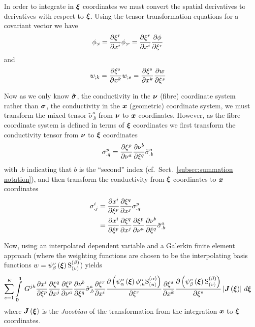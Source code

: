 In order to integrate in $\vect{\xi}$ coordinates we must convert the spatial
derivatives to derivatives with respect to $\vect{\xi}$. Using the tensor
transformation equations for a covariant vector we have
\begin{equation}  
   {\phi}_{;i} = \dfrac{\partial \xi^{r}}{\partial x^{i}}  {\phi}_{;r} = \dfrac{\partial \xi^{r}}{\partial x^{i}}  \dfrac{\partial \phi}{\partial \xi^{r}} 
\end{equation}
and 
\begin{equation}
   {w}_{;k} = \dfrac{\partial \xi^{s}}{\partial x^{k}}  {w}_{;s} = \dfrac{\partial \xi^{s}}{\partial x^{k}}  \dfrac{\partial w}{\partial \xi^{s}} 
\end{equation}

Now as we only know $\boldsymbol{\tilde{\sigma}}$, the conductivity in the
$\vect{\nu}$ (fibre) coordinate system rather than $\boldsymbol{\sigma}$, the
conductivity in the $\vect{x}$ (geometric) coordinate system, we must transform the mixed
tensor ${\tilde{\sigma}}^{a}_{.b}$ from $\vect{\nu}$ to $\vect{x}$ coordinates. However, as the
fibre coordinate system is defined in terms of $\vect{\xi}$ coordinates we
first transform the conductivity tensor from $\vect{\nu}$ to $\vect{\xi}$
coordinates \ie
\begin{equation}
  \sigma^{p}_{.q}= \dfrac{\partial \xi^{p}}{\partial \nu^{a}}  \dfrac{\partial \nu^{b}}{\partial \xi^{q}} {\tilde{\sigma}}^{a}_{.b}
\end{equation}
with $.b$ indicating that $b$ is the ``second'' index (cf.~Sect.~\ref{subsec:summation notation}),
and then transform the conductivity from $\vect{\xi}$ coordinates to
$\vect{x}$ coordinates \ie
\begin{equation}
  \begin{split}
    \sigma^{i}_{.j} &=  \dfrac{\partial x^{i}}{\partial \xi^{p}}  \dfrac{\partial \xi^{q}}{\partial x^{j}} {\sigma}^{p}_{.q} \\
    &=  \dfrac{\partial x^{i}}{\partial \xi^{p}}  \dfrac{\partial \xi^{q}}{\partial x^{j}}  \dfrac{\partial \xi^{p}}{\partial \nu^{a}}  \dfrac{\partial \nu^{b}}{\partial \xi^{q}} {\tilde{\sigma}}^{a}_{.b}
  \end{split}
\end{equation}

Now, using an interpolated dependent variable and a Galerkin finite element
approach (where the weighting functions are chosen to be the interpolating
basis functions \ie $w=\gbfn{\beta}{v}{\vect{\xi}}\gsf{(\beta)}{(v)}$) yields
\begin{equation}
  \dsum_{e=1}^{E}\gint{\vect{0}}{\vect{1}}{G^{jk}\delby{x^{i}}{\xi^{p}}
    \delby{\xi^{q}}{x^{j}}\delby{\xi^{p}} {\nu^{a}}
    \delby{\nu^{b}}{\xi^{q}}{\tilde{\sigma}}^{a}_{.b}\delby{\xi^{r}}{x^{i}}
    \delby{\pbrac{\gbfn{\alpha}{u}{\vect{\xi}}\nodedof{\phi}{\alpha}{u}\gsf{(\alpha)}{(u)}}}{\xi^{r}}
    \delby{\xi^{s}}{x^{k}}\delby{\pbrac{\gbfn{\beta}{v}{\vect{\xi}}\gsf{(\beta)}{(v)}}}{\xi^{s}}
    \abs{\fnof{\matr{J}}{\vect{\xi}}}}{\vect{\xi}}
\end{equation}
where $\fnof{\matr{J}}{\vect{\xi}}$ is the \emph{Jacobian} of the
transformation from the integration $\vect{x}$ to $\vect{\xi}$ coordinates.

